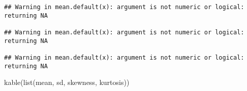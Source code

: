 \documentclass[
]{article}
\newenvironment{Shaded}{\begin{snugshade}}{\end{snugshade}}
\newcommand{\FunctionTok}[1]{\textcolor[rgb]{0.00,0.00,0.00}{#1}}
\newcommand{\NormalTok}[1]{#1}
\begin{document}
\begin{verbatim}
## Warning in mean.default(x): argument is not numeric or logical: returning NA

## Warning in mean.default(x): argument is not numeric or logical: returning NA

## Warning in mean.default(x): argument is not numeric or logical: returning NA
\end{verbatim}

\begin{Shaded}
\begin{Highlighting}[]
\FunctionTok{kable}\NormalTok{(}\FunctionTok{list}\NormalTok{(mean, sd, skewness, kurtosis))}
\end{Highlighting}
\end{Shaded}

\begin{table}


\end{table}
\end{document}
